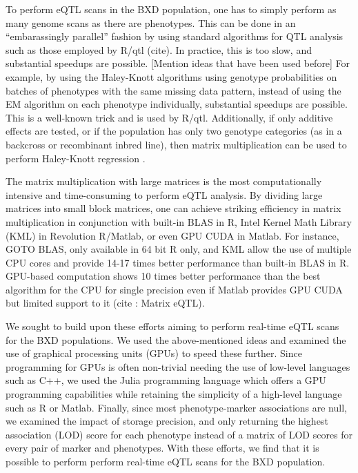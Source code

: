 \documentclass[9pt,twocolumn,twoside,lineno]{gsag3jnl}
\begin{document}
To perform eQTL scans in the BXD population, one has to simply perform
as many genome scans as there are phenotypes.  This can be done in an
 ``embarassingly parallel'' fashion by using standard algorithms for
 QTL analysis such as those employed by R/qtl (cite).  In practice,
this is too slow, and substantial speedups are possible.  [Mention
  ideas that have been used before] For example, by using the
Haley-Knott algorithms using genotype probabilities on batches of
phenotypes with the same missing data pattern, instead of using the EM
algorithm on each phenotype individually, substantial speedups are
possible.  This is a well-known trick and is used by R/qtl.
Additionally, if only additive effects are tested, or if the
population has only two genotype categories (as in a backcross or
recombinant inbred line), then matrix multiplication can be used to
perform Haley-Knott regression \citep{shabalin2012matrix}.  

The matrix multiplication with large matrices is the most computationally intensive and time-consuming 
to perform eQTL analysis.  By dividing large matrices into small block matrices, 
one can achieve striking efficiency in matrix multiplication in conjunction with built-in BLAS in R, 
Intel Kernel Math Library (KML) in Revolution R/Matlab, or even GPU CUDA in Matlab.  
For instance, GOTO BLAS, only available in 64 bit R only, and KML allow the use of multiple CPU cores and provide 14-17 times 
better performance than built-in BLAS in R.  GPU-based computation shows 10 times better performance than 
the best algorithm for the CPU for single precision even if Matlab provides GPU CUDA but limited support to it (cite : Matrix eQTL).


We sought to build upon these efforts aiming to perform real-time eQTL
scans for the BXD populations.  We used the above-mentioned ideas and
examined the use of graphical processing units (GPUs) to speed these
further.  Since programming for GPUs is often non-trivial needing the
use of low-level languages such as C++, we used the Julia programming
language which offers a GPU programming capabilities while retaining
the simplicity of a high-level language such as R or Matlab.  Finally,
since most phenotype-marker associations are null, we examined the
impact of storage precision, and only returning the highest
association (LOD) score for each phenotype instead of a matrix of LOD
scores for every pair of marker and phenotypes.  With these efforts,
we find that it is possible to perform perform real-time eQTL scans
for the BXD population.
\end{document}

